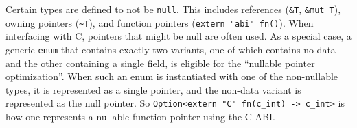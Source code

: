 \documentclass[]{article}
\begin{document}
Certain types are defined to not be \texttt{null}. This includes
references (\texttt{\&T}, \texttt{\&mut T}), owning pointers
(\texttt{\textasciitilde{}T}), and function pointers
(\texttt{extern "abi" fn()}). When interfacing with C, pointers that
might be null are often used. As a special case, a generic \texttt{enum}
that contains exactly two variants, one of which contains no data and
the other containing a single field, is eligible for the ``nullable
pointer optimization''. When such an enum is instantiated with one of
the non-nullable types, it is represented as a single pointer, and the
non-data variant is represented as the null pointer. So
\texttt{Option\textless{}extern "C" fn(c\_int) -\textgreater{} c\_int\textgreater{}}
is how one represents a nullable function pointer using the C ABI.
\end{document}
